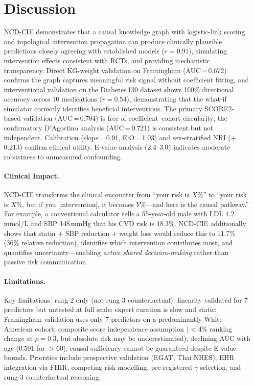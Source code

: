 \documentclass[runningheads]{llncs}
\begin{document}
\section{Discussion}\label{sec:discussion}

NCD-CIE demonstrates that a causal knowledge graph with logistic-link
scoring and topological intervention propagation can produce
clinically plausible predictions closely agreeing with established
models ($r = 0.91$), simulating intervention effects consistent with
RCTs, and providing mechanistic transparency.
Direct KG-weight validation on Framingham (AUC\,=\,0.672) confirms
the graph captures meaningful risk signal without coefficient fitting,
and interventional validation on the Diabetes\,130 dataset shows
100\% directional accuracy across 10 medications ($r = 0.54$),
demonstrating that the what-if simulator correctly identifies
beneficial interventions.
The primary SCORE2-based validation (AUC\,=\,0.704) is free of
coefficient--cohort circularity; the confirmatory D'Agostino analysis
(AUC\,=\,0.721) is consistent but not independent.
Calibration (slope\,=\,0.91, E:O\,=\,1.03) and sex-stratified
NRI ($+$0.213) confirm clinical utility.
E-value analysis (2.4--3.0) indicates moderate robustness to
unmeasured confounding.

\paragraph{Clinical Impact.}
NCD-CIE transforms the clinical encounter from ``your risk is
$X$\%'' to ``your risk is $X$\%, but if you [intervention], it
becomes $Y$\%---and here is the causal pathway.''
For example, a conventional calculator tells a 55-year-old male
with LDL 4.2\,mmol/L and SBP 148\,mmHg that his CVD risk is
18.3\%.
NCD-CIE additionally shows that statin + SBP reduction + weight
loss would reduce this to 11.7\% (36\% relative reduction),
identifies which intervention contributes most, and quantifies
uncertainty---enabling \emph{active shared decision-making} rather
than passive risk communication.

\paragraph{Limitations.}
Key limitations: rung-2 only (not rung-3 counterfactual); linearity
validated for 7 predictors but untested at full scale; expert curation
is slow and static; Framingham validation uses only 7 predictors on a
predominantly White American cohort; composite score independence
assumption ($<$4\% ranking change at $\rho=0.3$, but absolute risk
may be underestimated); declining AUC with age (0.591 for $>$60);
causal sufficiency cannot be guaranteed despite E-value bounds.
Priorities include prospective validation (EGAT, Thai NHES),
EHR integration via FHIR, competing-risk modelling,
pre-registered $\gamma$ selection, and rung-3 counterfactual
reasoning.
\end{document}
